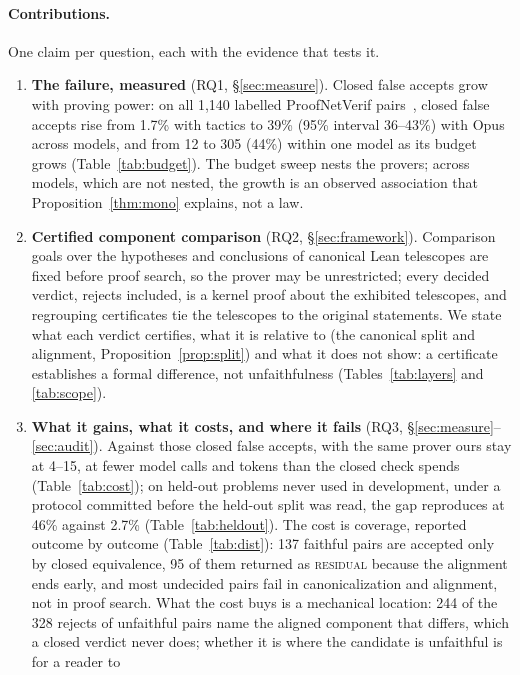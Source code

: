 \documentclass[10pt]{article}
\theoremstyle{definition}
\newcommand{\V}[1]{\textsc{#1}}
\begin{document}
\paragraph{Contributions.} One claim per question, each with the evidence that tests it.
\begin{enumerate}
\item[A.] \textbf{The failure, measured} (RQ1, \S\ref{sec:measure}). Closed false accepts grow
with proving power: on all 1,140 labelled ProofNetVerif pairs~\cite{proofnetverif}, closed false
accepts rise from 1.7\% with tactics to 39\% (95\% interval 36--43\%) with Opus across models,
and from 12 to 305 (44\%) within one model as its budget grows (Table~\ref{tab:budget}). The
budget sweep nests the provers; across models, which are not nested, the growth is an observed
association that Proposition~\ref{thm:mono} explains, not a law.
\item[B.] \textbf{Certified component comparison} (RQ2, \S\ref{sec:framework}). Comparison goals
over the hypotheses and conclusions of canonical Lean telescopes are fixed before proof search,
so the prover may be unrestricted; every decided verdict, rejects included, is a kernel proof
about the exhibited telescopes, and regrouping certificates tie the telescopes to the original
statements. We state what each verdict certifies, what it is relative to (the canonical split
and alignment, Proposition~\ref{prop:split}) and what it does not show: a certificate
establishes a formal difference, not unfaithfulness (Tables~\ref{tab:layers} and
\ref{tab:scope}).
\item[C.] \textbf{What it gains, what it costs, and where it fails} (RQ3,
\S\ref{sec:measure}--\ref{sec:audit}). Against those closed false accepts, with the same prover
ours stay at 4--15, at fewer model calls and tokens than the closed check spends
(Table~\ref{tab:cost}); on held-out problems never used in development, under a protocol committed
before the held-out split was read, the gap reproduces at 46\% against 2.7\%
(Table~\ref{tab:heldout}). The cost is coverage, reported outcome by outcome
(Table~\ref{tab:dist}): 137 faithful pairs are accepted only by closed equivalence, 95 of them
returned as \V{residual} because the alignment ends early, and most undecided pairs fail in
canonicalization and alignment, not in proof search. What the cost buys is a mechanical location:
244 of the 328 rejects of unfaithful pairs name the aligned component that differs, which a
closed verdict never does; whether it is where the candidate is unfaithful is for a reader to

\end{enumerate}
\end{document}
